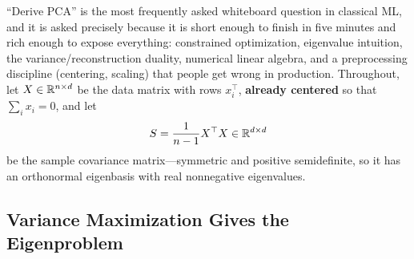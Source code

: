 ``Derive PCA'' is the most frequently asked whiteboard question in classical ML, and it is asked precisely because it is short enough to finish in five minutes and rich enough to expose everything: constrained optimization, eigenvalue intuition, the variance/reconstruction duality, numerical linear algebra, and a preprocessing discipline (centering, scaling) that people get wrong in production. Throughout, let $X \in \mathbb{R}^{n \times d}$ be the data matrix with rows $x_i^\top$, \textbf{already centered} so that $\sum_i x_i = 0$, and let
\begin{equation}
S = \frac{1}{n-1} X^\top X \in \mathbb{R}^{d \times d}
\end{equation}
be the sample covariance matrix---symmetric and positive semidefinite, so it has an orthonormal eigenbasis with real nonnegative eigenvalues.

\subsection{Variance Maximization Gives the Eigenproblem}

